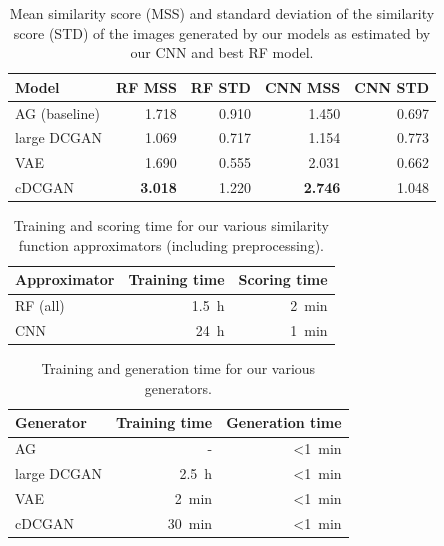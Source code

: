 \documentclass[10pt,conference,compsocconf]{IEEEtran}
\begin{document}
\begin{table}\centering
    \begin{tabular}{lrr|rr}
    \toprule
        Model           & RF MSS                & RF STD        & CNN MSS               & CNN STD \\
    \midrule
        AG (baseline)   & \SI{1.718}{}          & \SI{0.910}{}  & \SI{1.450}{}          & \SI{0.697}{} \\
        large DCGAN     & \SI{1.069}{}          & \SI{0.717}{}  & \SI{1.154}{}          & \SI{0.773}{} \\
        VAE             & \SI{1.690}{}          & \SI{0.555}{}  & \SI{2.031}{}          & \SI{0.662}{} \\
        cDCGAN          & \textbf{\SI{3.018}{}} & \SI{1.220}{}  & \textbf{\SI{2.746}{}} & \SI{1.048}{} \\
    \bottomrule
    \end{tabular}
\caption{Mean similarity score (MSS) and standard deviation of the similarity score (STD) of the images generated by our models as estimated by our CNN and best RF model.}
\label{tab:gen_MSS}
\end{table}

\begin{table}\centering
    \begin{tabular}{lrr}
    \toprule
        Approximator    & Training time     & Scoring time \\
    \midrule
        RF (all)        & \SI{1.5}{\hour}   & \SI{2}{\minute} \\
        CNN             & \SI{24}{\hour}    & \SI{1}{\minute}  \\
    \bottomrule
    \end{tabular}
\caption{Training and scoring time for our various similarity function approximators (including preprocessing).}\label{tab:SFA_time}
\end{table}

\begin{table}\centering
    \begin{tabular}{lrr}
    \toprule
        Generator   & Training time     & Generation time \\
    \midrule
        AG          & -                 & \SI{<1}{\minute} \\
        large DCGAN & \SI{2.5}{\hour}   & \SI{<1}{\minute} \\
        VAE         & \SI{2}{\minute}   & \SI{<1}{\minute} \\
        cDCGAN      & \SI{30}{\minute}  & \SI{<1}{\minute} \\
    \bottomrule
    \end{tabular}
\caption{Training and generation time for our various generators.}
\label{tab:gen_time}
\end{table}
\end{document}
